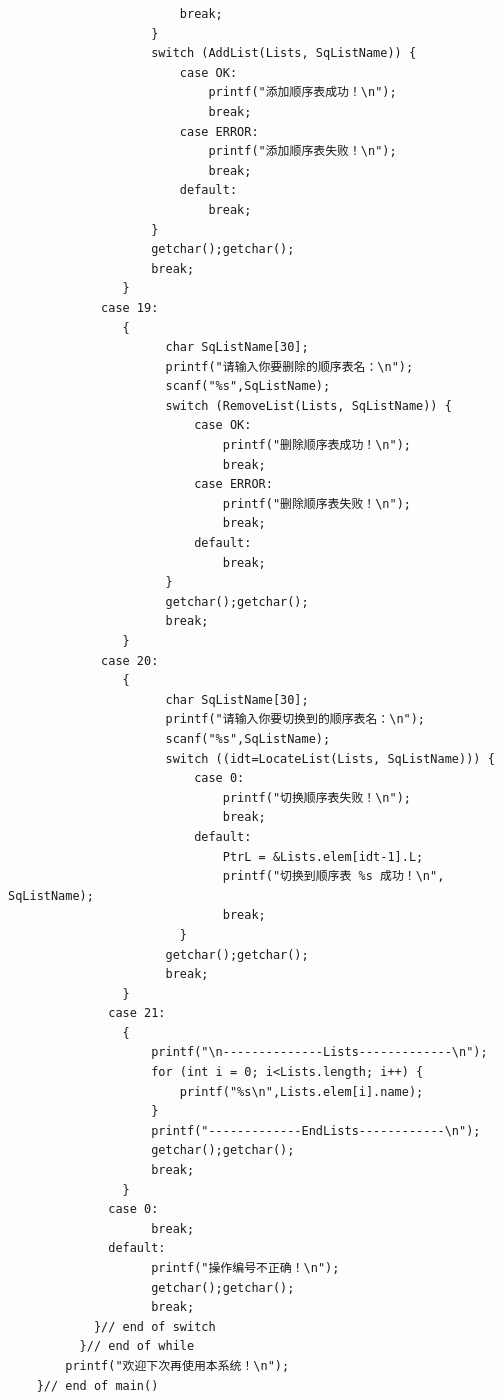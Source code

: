 \documentclass[supercite]{Experimental_Report}
\theoremstyle{definition}
\begin{document}
\begin{lstlisting}
						break;
					}
					switch (AddList(Lists, SqListName)) {
						case OK:
							printf("添加顺序表成功！\n");
							break;
						case ERROR:
							printf("添加顺序表失败！\n");
							break;
						default:
							break;
					}
					getchar();getchar();
					break;
				}
			 case 19:
				{
					  char SqListName[30];
					  printf("请输入你要删除的顺序表名：\n");
					  scanf("%s",SqListName);
					  switch (RemoveList(Lists, SqListName)) {
						  case OK:
							  printf("删除顺序表成功！\n");
							  break;
						  case ERROR:
							  printf("删除顺序表失败！\n");
							  break;
						  default:
							  break;
					  }
					  getchar();getchar();
					  break;
				}
			 case 20:
				{
					  char SqListName[30];
					  printf("请输入你要切换到的顺序表名：\n");
					  scanf("%s",SqListName);
					  switch ((idt=LocateList(Lists, SqListName))) {
						  case 0:
							  printf("切换顺序表失败！\n");
							  break;
						  default:
							  PtrL = &Lists.elem[idt-1].L;
							  printf("切换到顺序表 %s 成功！\n", SqListName);
							  break;
						}
					  getchar();getchar();
					  break;
				}
			  case 21:
				{
					printf("\n--------------Lists-------------\n");
					for (int i = 0; i<Lists.length; i++) {
						printf("%s\n",Lists.elem[i].name);
					}
					printf("-------------EndLists------------\n");
					getchar();getchar();
					break;
				}
			  case 0:
					break;
			  default:
					printf("操作编号不正确！\n");
					getchar();getchar();
					break;
			}// end of switch
		  }// end of while
		printf("欢迎下次再使用本系统！\n");
	}// end of main()
		
\end{lstlisting}
\end{document}
